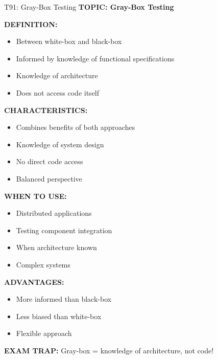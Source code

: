 \documentclass[8pt]{beamer}
\begin{document}
	\begin{frame}{T91: Gray-Box Testing}
		\fontsize{6.5}{7.5}\selectfont
		\textbf{TOPIC: Gray-Box Testing}
		
		\vspace{0.1cm}
		\textbf{DEFINITION:}
		\begin{itemize}
			\item Between white-box and black-box
			\item Informed by knowledge of functional specifications
			\item Knowledge of architecture
			\item Does not access code itself
		\end{itemize}
		
		\vspace{0.1cm}
		\textbf{CHARACTERISTICS:}
		\begin{itemize}
			\item Combines benefits of both approaches
			\item Knowledge of system design
			\item No direct code access
			\item Balanced perspective
		\end{itemize}
		
		\vspace{0.1cm}
		\textbf{WHEN TO USE:}
		\begin{itemize}
			\item Distributed applications
			\item Testing component integration
			\item When architecture known
			\item Complex systems
		\end{itemize}
		
		\vspace{0.1cm}
		\textbf{ADVANTAGES:}
		\begin{itemize}
			\item More informed than black-box
			\item Less biased than white-box
			\item Flexible approach
		\end{itemize}
		
		\textcolor{myred}{\textbf{EXAM TRAP:}} Gray-box = \textcolor{myblue}{knowledge of architecture, not code}!
	\end{frame}
	
\end{document}
